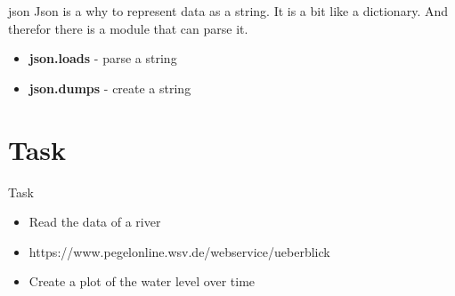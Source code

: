 \documentclass{beamer}
\begin{document}
                \begin{frame}{json}
                    Json is a why to represent data as a string.\pause
                    It is a bit like a dictionary. And therefor there is a module that can parse it.\pause
                    \begin{itemize}
                        \item \textbf{json.loads} - parse a string
                        \item \textbf{json.dumps} - create a string
                    \end{itemize}
                    
                \end{frame}

                    

                \section{Task}
                \begin{frame}{Task}
                    \begin{itemize}
                        \item Read the data of a river
                        \item https://www.pegelonline.wsv.de/webservice/ueberblick
                        \item Create a plot of the water level over time
                    \end{itemize}
                    \end{frame}
\end{document}

